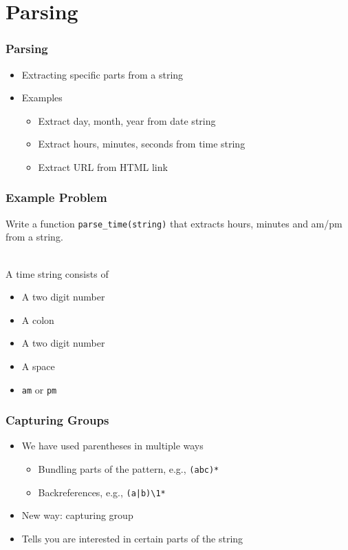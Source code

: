\section{Parsing}

\frame{\tableofcontents[currentsection]}

\begin{frame}
  \frametitle{Parsing}
  \begin{itemize}
    \item Extracting specific parts from a string
    \item Examples
      \begin{itemize}
        \item Extract day, month, year from date string
        \item Extract hours, minutes, seconds from time string
        \item Extract URL from HTML link
      \end{itemize}
  \end{itemize}
\end{frame}

\begin{frame}
  \frametitle{Example Problem}
  \begin{center}
    Write a function \texttt{parse\_time(string)} that extracts hours, minutes and am/pm from a string.
  \end{center}
  \vskip5mm
  \\[2mm]
  A time string consists of
  \begin{itemize}
    \item A two digit number
    \item A colon
    \item A two digit number
    \item A space
    \item \texttt{am} or \texttt{pm}
  \end{itemize}
\end{frame}

\begin{frame}
  \frametitle{Capturing Groups}
  \begin{itemize}
    \item We have used parentheses in multiple ways
      \begin{itemize}
        \item Bundling parts of the pattern, e.g., \texttt{(abc)*}
        \item Backreferences, e.g., \texttt{(a|b)\textbackslash1*}
      \end{itemize}
    \item New way: capturing group
    \item Tells you are interested in certain parts of the string
  \end{itemize}
\end{frame}

